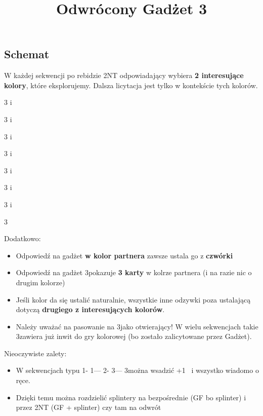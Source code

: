 \documentclass[12pt, a4paper]{article}
\title{\vspace{-2.5cm}Odwrócony Gadżet 3\clubs}
\author{}
\date{}
\begin{document}
\maketitle

\subsection*{Schemat}
W każdej sekwencji po rebidzie 2NT odpowiadający wybiera \textbf{2 interesujące kolory}, które eksplorujemy.
Dalsza licytacja jest tylko w kontekście tych kolorów.

\sequence{{1\clubs}{1\hearts}{2\ntx}}
\begin{options}[2]
    \item[3\clubs] \hearts i \clubs
    \item[3\diams] \hearts i \diams
    \item[3\hearts] \hearts i \spades \vimp
    \item[3\spades] \hearts i \spades 
\end{options}
\sequence{{1\clubs}{1\spades}{2\ntx}}
\begin{options}[2]
    \item[3\clubs] \spades i \clubs
    \item[3\diams] \spades i \diams
    \item[3\hearts] \spades i \hearts
    \item[3\spades] \spades
\end{options}

Dodatkowo:
\begin{itemize}
    \item Odpowiedź na gadżet \textbf{w kolor partnera} zawsze ustala go z \textbf{czwórki}
    \item Odpowiedź na gadżet 3\diams pokazuje \textbf{3 karty} w kolrze partnera (i na razie nic o drugim kolorze)
    \item Jeśli kolor da się ustalić naturalnie, wszystkie inne odzywki poza 
    ustalającą dotyczą \textbf{drugiego z interesujących kolorów}.
    \item Należy uważać na pasowanie na 3\nt jako otwierający! W wielu sekwencjach takie 3\nt zawiera już 
    inwit do gry kolorowej (bo zostało zalicytowane przez Gadżet).
\end{itemize}

Nieoczywiste zalety:
\begin{itemize}
    \item W sekwencjach typu 1\clubs - 1\spades --- 2\nt - 3\clubs --- 3\spades można
    wsadzić +1 \lsf\ i wszystko wiadomo o ręce. 
    \item Dzięki temu można rozdzielić splintery na bezpośrednie (GF bo splinter) i przez 2NT (GF + splinter)
    czy tam na odwrót
\end{itemize}
\end{document}
